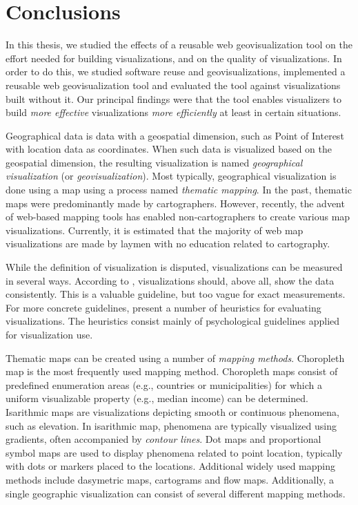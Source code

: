 
\chapter{Conclusions}
\label{chapter:conclusions}

In this thesis, we studied the effects of a reusable web geovisualization tool on the effort needed for building visualizations, and on the quality of visualizations. In order to do this, we studied software reuse and geovisualizations, implemented a reusable web geovisualization tool and evaluated the tool against visualizations built without it. Our principal findings were that the tool enables visualizers to build \emph{more effective} visualizations \emph{more efficiently} at least in certain situations.

Geographical data is data with a geospatial dimension, such as Point of Interest with location data as coordinates. When such data is visualized based on the geospatial dimension, the resulting visualization is named \emph{geographical visualization} (or \emph{geovisualization}). Most typically, geographical visualization is done using a map using a process named \emph{thematic mapping}. In the past, thematic maps were predominantly made by cartographers. However, recently, the advent of web-based mapping tools has enabled non-cartographers to create various map visualizations. Currently, it is estimated that the majority of web map visualizations are made by laymen with no education related to cartography.

While the definition of visualization is disputed, visualizations can be measured in several ways. According to \citet{tufte_visual_1986}, visualizations should, above all, show the data consistently. This is a valuable guideline, but too vague for exact measurements. For more concrete guidelines, \citet{zuk_heuristics_2006} present a number of heuristics for evaluating visualizations. The heuristics consist mainly of psychological guidelines applied for visualization use.

Thematic maps can be created using a number of \emph{mapping methods}. Choropleth map is the most frequently used mapping method. Choropleth maps consist of predefined enumeration areas (e.g., countries or municipalities) for which a uniform visualizable property (e.g., median income) can be determined. Isarithmic maps are visualizations depicting smooth or continuous phenomena, such as elevation. In isarithmic map, phenomena are typically visualized using gradients, often accompanied by \emph{contour lines}. Dot maps and proportional symbol maps are used to display phenomena related to point location, typically with dots or markers placed to the locations. Additional widely used mapping methods include dasymetric maps, cartograms and flow maps. Additionally, a single geographic visualization can consist of several different mapping methods.


